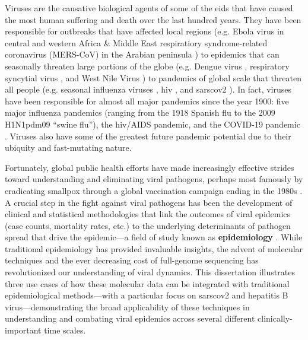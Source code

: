 Viruses are the causative biological agents of some of the \gls{eid}s that have caused the most human suffering and death over the last hundred years.
They have been responsible for outbreaks that have affected local regions (e.g. Ebola virus in central and western Africa \citep{dudas2017virus} \& Middle East respiratiory syndrome-related coronavirus (MERS-CoV) in the Arabian peninsula \citep{dudas2018mers-cov}) to epidemics that can seasonally threaten large portions of the globe (e.g. Dengue virus \citep{ross2010dengue}, respiratory syncytial virus \citep{welliver2003review}, and West Nile Virus \citep{hadfield2019twenty}) to pandemics of global scale that threaten all people (e.g. seasonal influenza viruses \citep{hsieh2006influenza,lina2008history}, \gls{hiv} \citep{merson2008history}, and \gls{sarscov2} \citep{Andersen2020}).
In fact, viruses have been responsible for almost all major pandemics since the year 1900: five major influenza pandemics (ranging from the 1918 Spanish flu to the 2009 H1N1pdm09 ``swine flu''), the \gls{hiv}/AIDS pandemic, and the COVID-19 pandemic \citep{roychoudhury2021viral,piret2021pandemics}.
Viruses also have some of the greatest future pandemic potential due to their ubiquity and fast-mutating nature.

Fortunately, global public health efforts have made increasingly effective strides toward understanding and eliminating viral pathogens, perhaps most famously by eradicating smallpox through a global vaccination campaign ending in the 1980s \citep{fenner1982global,henderson2011eradication}.
A crucial step in the fight against viral pathogens has been the development of clinical and statistical methodologies that link the outcomes of viral epidemics (case counts, mortality rates, etc.) to the underlying determinants of pathogen spread that drive the epidemic---a field of study known as \textbf{epidemiology} \citep{rothman2024epidemiology}.
While traditional epidemiology has provided invaluable insights, the advent of molecular techniques \citep{gilchrist2015whole} and the ever decreasing cost of full-genome sequencing \citep{sboner2011real,mardis2017dna} has revolutionized our understanding of viral dynamics.
This dissertation illustrates three use cases of how these molecular data can be integrated with traditional epidemiological methods---with a particular focus on \gls{sarscov2} and hepatitis B virus---demonstrating the broad applicability of these techniques in understanding and combating viral epidemics across several different clinically-important time scales.

